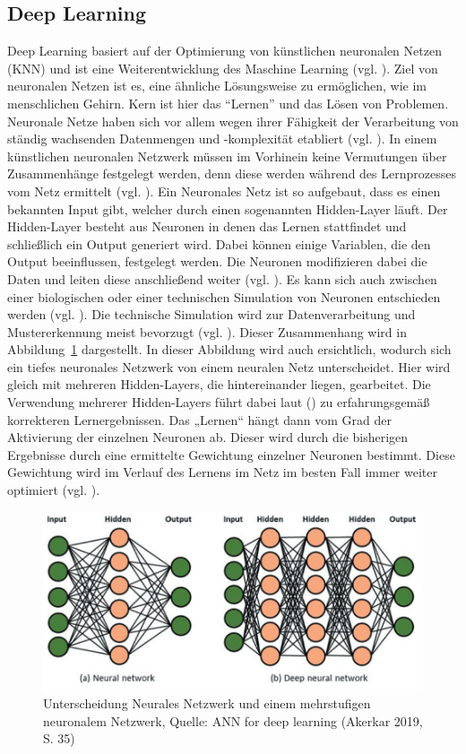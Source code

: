 \subsection{Deep Learning}
Deep Learning basiert auf der Optimierung von künstlichen neuronalen Netzen (KNN) und ist eine Weiterentwicklung des Maschine Learning (vgl. \cite[S. 1]{Georgevici.2019}). Ziel von neuronalen Netzen ist es, eine ähnliche Lösungsweise zu ermöglichen, wie im menschlichen Gehirn. Kern ist hier das “Lernen” und das Lösen von Problemen. Neuronale Netze haben sich vor allem wegen ihrer Fähigkeit der Verarbeitung von ständig wachsenden Datenmengen und -komplexität etabliert (vgl. \cite[S. 373]{Welsch.2018}). In einem künstlichen neuronalen Netzwerk müssen im Vorhinein keine Vermutungen über Zusammenhänge festgelegt werden, denn diese werden während des Lernprozesses vom Netz ermittelt (vgl. \cite[S. 581]{Backhaus.2018b}). Ein Neuronales Netz ist 
so aufgebaut, dass es einen bekannten Input gibt, welcher durch einen sogenannten Hidden-Layer läuft. Der Hidden-Layer besteht aus Neuronen in denen das Lernen stattfindet und schließlich ein Output generiert wird. Dabei können einige Variablen, die den Output beeinflussen, festgelegt werden. 
Die Neuronen modifizieren dabei die Daten und leiten diese anschließend weiter (vgl. \cite[S. 373]{Welsch.2018}). Es kann sich auch zwischen einer biologischen oder einer technischen Simulation von Neuronen entschieden werden (vgl. \cite{https:www.facebook.comspektrumverlag.04.12.2014}). Die technische Simulation wird zur Datenverarbeitung und Mustererkennung meist bevorzugt (vgl. \cite{https:www.facebook.comspektrumverlag.04.12.2014}). Dieser Zusammenhang wird in Abbildung~\ref{fig:NeuralVsDeepNeural} dargestellt. 
In dieser Abbildung wird auch ersichtlich, wodurch sich ein tiefes neuronales Netzwerk von einem neuralen Netz unterscheidet. Hier wird gleich mit mehreren Hidden-Layers, die hintereinander liegen, gearbeitet. Die Verwendung mehrerer Hidden-Layers führt dabei laut (\cite[S. 581]{Backhaus.2018b}) zu erfahrungsgemäß korrekteren Lernergebnissen. Das „Lernen“ hängt dann vom Grad der Aktivierung der einzelnen Neuronen ab. Dieser wird durch die bisherigen Ergebnisse durch eine ermittelte Gewichtung einzelner Neuronen bestimmt. Diese Gewichtung wird im Verlauf des Lernens im Netz im besten Fall immer weiter optimiert (vgl. \cite[S. 586]{Backhaus.2018b}).
\begin{figure}[ht]
\centering
\includegraphics[width=\linewidth]{pics/ANN_for_deep_learning_P35}
\caption{Unterscheidung Neurales Netzwerk und einem mehrstufigen neuronalem Netzwerk, Quelle: ANN for deep learning (Akerkar 2019, S. 35)}
\label{fig:NeuralVsDeepNeural}
\end{figure}
